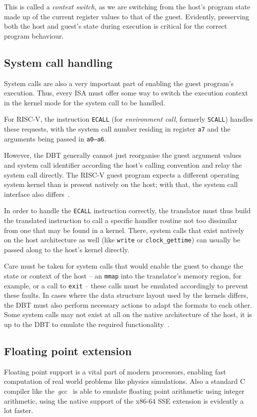 This is called a \textit{context switch}, as we are switching from the host's program state made up of the current register values to that of the guest.
Evidently, preserving both the host and guest's state during execution is critical for the correct program behaviour.


\subsection{System call handling}
\label{sec:syscall-handling}
System calls are also a very important part of enabling the guest program's execution.
Thus, every ISA must offer some way to switch the execution context in the kernel mode for the system call to be handled.

For RISC-V, the instruction \texttt{ECALL} (for \textit{environment call}, formerly \texttt{SCALL}) handles these requests, with the system call number residing in register \texttt{a7} and the arguments being passed in \texttt{a0--a6}.

However, the DBT generally cannot just reorganise the guest argument values and system call identifier according the host's calling convention and relay the system call directly.
The RISC-V guest program expects a different operating system kernel than is present natively on the host;
with that, the system call interface also differs~\cite[S. 2f.]{bintrans}.

In order to handle the \texttt{ECALL} instruction correctly, the translator must thus build the translated instruction to call a specific handler routine not too dissimilar from one that may be found in a kernel.
There, system calls that exist natively on the host architecture as well (like \texttt{write} or \texttt{clock\_gettime}) can usually be passed along to the host's kernel directly.

Care must be taken for system calls that would enable the guest to change the state or context of the host -- an \texttt{mmap} into the translator's memory region, for example, or a call to \texttt{exit} -- these calls must be emulated accordingly to prevent these faults.
In cases where the data structure layout used by the kernels differs, the DBT must also perform necessary actions to adapt the formats to each other.
Some system calls may not exist at all on the native architecture of the host, it is up to the DBT to emulate the required functionality~\cite[S. 2f.]{bintrans}.

\subsection{Floating point extension}
\label{subsec:fp_extension}
Floating point support is a vital part of modern processors, enabling fast computation of real world problems like physics simulations.
Also a standard C compiler like the~\textit{gcc}~\cite{gcc-web} is able to emulate floating point arithmetic using integer arithmetic, using the native support of the x86-64 SSE extension is evidently a lot faster. %

